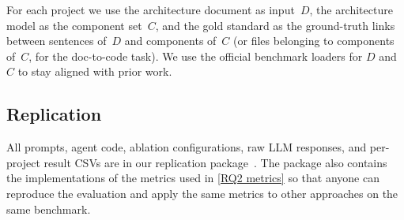 For each project we use the architecture document as input~$D$, the architecture model as the component set~$C$, and the gold standard as the ground-truth links between sentences of~$D$ and components of~$C$ (or files belonging to components of~$C$, for the doc-to-code task).
We use the official benchmark loaders for $D$ and $C$ to stay aligned with prior work.

\subsection{Replication}
\label{sec:replication}

All prompts, agent code, ablation configurations, raw \ac{LLM} responses, and per-project result CSVs are in our replication package~\cite{replication}.
The package also contains the implementations of the metrics used in \ref{RQ2 metrics} so that anyone can reproduce the evaluation and apply the same metrics to other approaches on the same benchmark.
